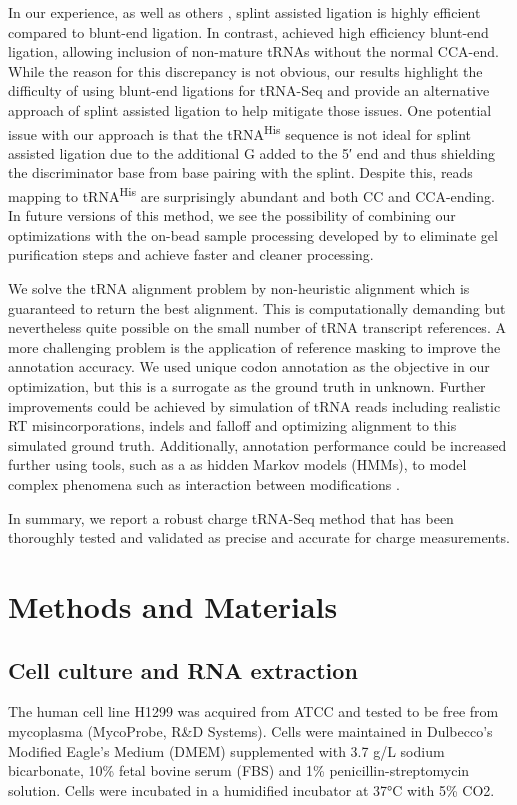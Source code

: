 \documentclass[9pt,lineno]{elife}
\begin{document}
In our experience, as well as others \citep{Shigematsu2017-tv}, splint assisted ligation is highly efficient compared to blunt-end ligation.
In contrast, \cite{Behrens2021-gb} achieved high efficiency blunt-end ligation, allowing inclusion of non-mature tRNAs without the normal CCA-end.
While the reason for this discrepancy is not obvious, our results highlight the difficulty of using blunt-end ligations for tRNA-Seq and provide an alternative approach of splint assisted ligation to help mitigate those issues.
One potential issue with our approach is that the tRNA\textsuperscript{His} sequence is not ideal for splint assisted ligation due to the additional G added to the 5′ end \citep{Heinemann2012-hq} and thus shielding the discriminator base from base pairing with the splint.
Despite this, reads mapping to tRNA\textsuperscript{His} are surprisingly abundant and both CC and CCA-ending.
In future versions of this method, we see the possibility of combining our optimizations with the on-bead sample processing developed by \cite{Watkins2022-er} to eliminate gel purification steps and achieve faster and cleaner processing.

We solve the tRNA alignment problem by non-heuristic alignment which is guaranteed to return the best alignment.
This is computationally demanding but nevertheless quite possible on the small number of tRNA transcript references.
A more challenging problem is the application of reference masking to improve the annotation accuracy.
We used unique codon annotation as the objective in our optimization, but this is a surrogate as the ground truth in unknown.
Further improvements could be achieved by simulation of tRNA reads including realistic RT misincorporations, indels and falloff and optimizing alignment to this simulated ground truth.
Additionally, annotation performance could be increased further using tools, such as a as hidden Markov models (HMMs), to model complex phenomena such as interaction between modifications \citep{Wang2021-fc, Hernandez-Alias2022-ch}.

In summary, we report a robust charge tRNA-Seq method that has been thoroughly tested and validated as precise and accurate for charge measurements.






\section{Methods and Materials}
\subsection{Cell culture and RNA extraction}
The human cell line H1299 was acquired from ATCC and tested to be free from mycoplasma (MycoProbe, R\&D Systems).
Cells were maintained in Dulbecco’s Modified Eagle’s Medium (DMEM) supplemented with 3.7 g/L sodium bicarbonate, 10\% fetal bovine serum (FBS) and 1\% penicillin-streptomycin solution.
Cells were incubated in a humidified incubator at 37°C with 5\% CO2.
\end{document}
